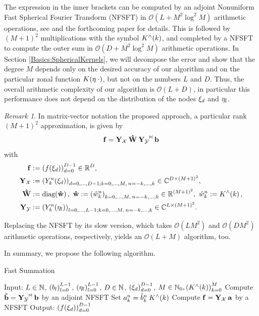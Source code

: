\documentclass[11pt,a4paper,twoside,bibtotoc]{scrartcl}
\theoremstyle{plain}
\theoremstyle{definition}
\theoremstyle{remark}
\newtheorem{remark}[theorem]{Remark}
\newcommand{\adj}{{\vdash \hspace*{-1.72mm} \dashv}}
\numberwithin{equation}{section}
\numberwithin{table}{section}
\numberwithin{figure}{section}
\begin{document}
The expression in the inner brackets can be computed by an adjoint Nonuniform
Fast Spherical Fourier Transform (NFSFT) in $\mathcal{O}(L + M^2 \log^2 M)$
arithmetic operations, see \cite{} and the forthcoming paper \cite{} for
details.
This is followed by $(M+1)^2$ multiplications with the symbol
$K^{\wedge}{\hspace{-0.4ex}}\left(k\right)$, and completed by a NFSFT to compute the outer sum in
$\mathcal{O}(D + M^2 \log^2 M)$ arithmetic operations.
In Section \ref{Basics:SphericalKernels}, we will decompose the error and show
that the degree $M$ depends only on the desired accuracy of our algorithm and
on the particular zonal function $K{\hspace{-0.4ex}}\left(\mathbf{\eta} \: \cdot\right)$, but not on the
numbers $L$ and $D$.
Thus, the overall arithmetic complexity of our algorithm is $\mathcal{O}(L +
D)$, in particular this performance does not depend on the distribution of the
nodes $\mathbf{\xi}_{d}$ and $\mathbf{\eta}_{l}$.

\begin{remark}
In matrix-vector notation the proposed approach, a particular rank $(M+1)^2$
approximation, is given by
\[
  \V{f} = \V{Y_{\mathcal{X}}} \: \V{\hat W} \:
  \V{Y_{\mathcal{Y}}}^{\adj} \: \V{b}
\]
with
\begin{align}
  \nonumber
  \mathbf{f} & := \left(f{\hspace{-0.4ex}}\left(\mathbf{\xi}_{d}\right)\right)_{d=0}^{D-1} \in \mathbb{R}^D,
  \\ \nonumber
  \mathbf{Y_{\mathcal{X}}} & := \left(Y_k^n{\hspace{-0.4ex}}\left(\mathbf{\xi}_{d}\right)\right)_{d=0,\ldots,D-1;
  k=0,\ldots,M,\:n=-k,\ldots,k} \in \mathbb{C}^{D \times
  \left(M+1\right)^2}, \\ \nonumber
  \mathbf{\hat W} & := \text{\rm{diag}}{\hspace{-0.4ex}}\left(\mathbf{\hat w}\right),\ \mathbf{\hat w} := \left(\hat
  w_{k}^{n}\right)_{k=0,\ldots,M,\:n=-k,\ldots,k} \in \mathbb{R}^{(M+1)^2},\ \hat w_{k}^n :=
  K^{\wedge}{\hspace{-0.4ex}}\left(k\right), \\ \nonumber
  \mathbf{Y_{\mathcal{Y}}} & := \left(Y_k^n{\hspace{-0.4ex}}\left(\mathbf{\eta}_{l}\right)\right)_{l=0,\ldots,L-1;
  k=0,\ldots,M,\:n=-k,\ldots,k} \in \mathbb{C}^{L \times \left(M+1\right)^2}.
\end{align}

Replacing the NFSFT by its slow version, which takes $\mathcal{O}(L M^2)$ and
$\mathcal{O}(D M^2)$ arithmetic operations, respectively, yields an
$\mathcal{O}(L+M)$ algorithm, too.
\end{remark}

In summary, we propose the following algorithm.
\begin{algorithm}[h]
  \caption{Fast Summation}
  \label{Applications:Algorithm:FastSummation}    
  \begin{algorithmic}
    \STATE  Input:  $L \in \mathbb{N}$, $\left(b_{l}\right)_{l=0}^{L-1}$, $\left(\mathbf{\eta}_{l}\right)_{l=0}^{L-1}$, 
                    $D \in \mathbb{N}$, $\left(\mathbf{\xi}_{d}\right)_{d=0}^{D-1}$, $M \in \mathbb{N}_{0}, \left(K^{\wedge}{\hspace{-0.4ex}}\left(k\right)\right)_{k=0}^M$
    \STATE
    \STATE Compute $\V{\tilde{b}}= \V{Y_{\mathcal{Y}}}^{\adj} \: \V{b}$ by an
                    adjoint NFSFT 
    \STATE 
        \STATE Set $a_{k}^n = \tilde{b}_{k}^n \: K^{\wedge}{\hspace{-0.4ex}}\left(k\right)$
      \ENDFOR
    \ENDFOR
    \STATE
    \STATE Compute $\mathbf{f} = \mathbf{Y_{\mathcal{X}}} \: \mathbf{a}$ by a NFSFT
    \STATE
    \STATE Output: $\left(f{\hspace{-0.4ex}}\left(\mathbf{\xi}_{d}\right)\right)_{d=0}^{D-1}$
\end{algorithmic}
\end{algorithm}
\end{document}
